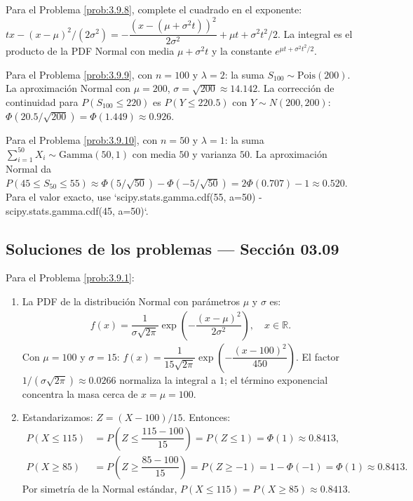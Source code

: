 \begin{sugerencia}
	\label{sug:3.9.8}
	Para el Problema \ref{prob:3.9.8}, complete el cuadrado en el exponente: $tx - (x-\mu)^{2}/(2\sigma^{2}) = -\dfrac{(x - (\mu + \sigma^{2}t))^{2}}{2\sigma^{2}} + \mu t + \sigma^{2}t^{2}/2$. La integral es el producto de la PDF Normal con media $\mu + \sigma^{2}t$ y la constante $e^{\mu t + \sigma^{2}t^{2}/2}$.
\end{sugerencia}

\begin{sugerencia}
	\label{sug:3.9.9}
	Para el Problema \ref{prob:3.9.9}, con $n = 100$ y $\lambda = 2$: la suma $S_{100} \sim \text{Pois}(200)$. La aproximación Normal con $\mu = 200$, $\sigma = \sqrt{200} \approx 14.142$. La corrección de continuidad para $P(S_{100} \le 220)$ es $P(Y \le 220.5)$ con $Y \sim N(200, 200)$: $\Phi(20.5/\sqrt{200}) = \Phi(1.449) \approx 0.926$.
\end{sugerencia}

\begin{sugerencia}
	\label{sug:3.9.10}
	Para el Problema \ref{prob:3.9.10}, con $n = 50$ y $\lambda = 1$: la suma $\sum_{i=1}^{50} X_{i} \sim \text{Gamma}(50, 1)$ con media $50$ y varianza $50$. La aproximación Normal da $P(45 \le S_{50} \le 55) \approx \Phi(5/\sqrt{50}) - \Phi(-5/\sqrt{50}) = 2\Phi(0.707) - 1 \approx 0.520$. Para el valor exacto, use `scipy.stats.gamma.cdf(55, a=50) - scipy.stats.gamma.cdf(45, a=50)`.
\end{sugerencia}

\subsection*{Soluciones de los problemas --- Sección 03.09}

\begin{solucion}
	\label{sol:3.9.1}
	Para el Problema \ref{prob:3.9.1}:
	\begin{enumerate}
		\item La PDF de la distribución Normal con parámetros $\mu$ y $\sigma$ es:
		\begin{align*}
			f(x) = \dfrac{1}{\sigma\sqrt{2\pi}} \exp\left(-\dfrac{(x - \mu)^{2}}{2\sigma^{2}}\right), \quad x \in \mathbb{R}.
		\end{align*}
		Con $\mu = 100$ y $\sigma = 15$: $f(x) = \dfrac{1}{15\sqrt{2\pi}} \exp\left(-\dfrac{(x-100)^{2}}{450}\right)$. El factor $1/(\sigma\sqrt{2\pi}) \approx 0.0266$ normaliza la integral a $1$; el término exponencial concentra la masa cerca de $x = \mu = 100$.
		\item Estandarizamos: $Z = (X - 100)/15$. Entonces:
		\begin{align*}
			P(X \le 115) &= P\left(Z \le \dfrac{115 - 100}{15}\right) = P(Z \le 1) = \Phi(1) \approx 0.8413, \\
			P(X \ge 85) &= P\left(Z \ge \dfrac{85 - 100}{15}\right) = P(Z \ge -1) = 1 - \Phi(-1) = \Phi(1) \approx 0.8413.
		\end{align*}
		Por simetría de la Normal estándar, $P(X \le 115) = P(X \ge 85) \approx 0.8413$.
	\end{enumerate}
\end{solucion}

